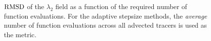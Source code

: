\begin{figure}[htpb]
    \centering
    
    \caption[$\rmsd$ of the $\lambda_{2}$ field as a function of the required
    number of function evaluations]{
    $\rmsd$ of the $\lambda_{2}$ field as a function of the required number of
    function evaluations. For the adaptive stepsize methods, the \emph{average}
    number of function evaluations across all advected tracers is used as the
    metric.}
\label{fig:lmbd2_err_both}
\end{figure}
